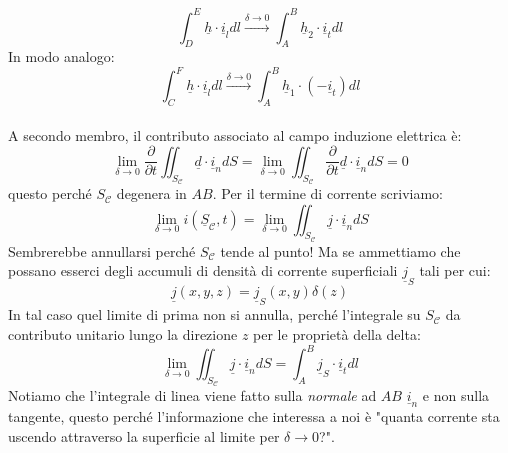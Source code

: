 \documentclass{book}
\begin{document}
        \begin{equation}
            \int_{D} ^{E} \underline{h} \cdot \underline{i}_{l}dl \stackrel{\delta \to 0}{\to} \int_{A} ^{B} \underline{h}_{2} \cdot \underline{i}_{t} dl
        \end{equation}
        In modo analogo:
        \begin{equation}
            \int_{C} ^{F} \underline{h} \cdot \underline{i}_{l}dl \stackrel{\delta \to 0}{\to} \int_{A} ^{B} \underline{h}_{1} \cdot (-\underline{i}_{t}) dl
        \end{equation}
        \\ A secondo membro, il contributo associato al campo induzione elettrica è:
        \begin{equation}
            \lim_{\delta \to 0} \frac{\partial}{ \partial t} \iint_{S_{\mathcal{C}}} \underline{d} \cdot \underline{i}_{n}dS = \lim_{\delta \to 0} \iint_{S_{\mathcal{C}}} \frac{\partial}{\partial t} \underline{d} \cdot \underline{i}_{n} dS = 0
        \end{equation}
        questo perché $S_{\mathcal{C}}$ degenera in $AB$. Per il termine di corrente scriviamo:
        \begin{equation}
            \lim_{\delta \to 0} i(\underline{S}_{\mathcal{C}}, t) = \lim_{\delta \to 0} \iint_{S_{\mathcal{C}}} \underline{j} \cdot \underline{i}_{n}dS
        \end{equation}
        Sembrerebbe annullarsi perché $S_{\mathcal{C}}$ tende al punto! Ma se ammettiamo che possano esserci degli accumuli di densità di corrente superficiali $\underline{j}_{S}$ tali per cui:
        \begin{equation}
            \underline{j}(x,y,z) = \underline{j}_{S}(x,y) \delta (z)
        \end{equation}
        In tal caso quel limite di prima non si annulla, perché l'integrale su $S_{\mathcal{C}}$ da contributo unitario lungo la direzione $z$ per le proprietà della delta:
        \begin{equation}
            \lim_{\delta \to 0} \iint_{S_{\mathcal{C}}} \underline{j} \cdot \underline{i}_{n}dS = \int_{A} ^{B} \underline{j}_{S} \cdot \underline{i}_{t} dl
        \end{equation}
        Notiamo che l'integrale di linea viene fatto sulla \textit{normale} ad $AB$ $\underline{i}_{n}$ e non sulla tangente, questo perché l'informazione che interessa a noi è "quanta corrente sta uscendo attraverso la superficie al limite per $\delta \to 0$?". \\
\end{document}
